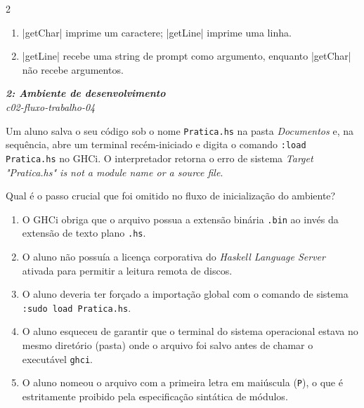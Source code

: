 \documentclass[a4paper,10pt,brazil]{article}
\begin{document}
\begin{multicols}{2}
\begin{enumerate}
  \item \haskellinline|getChar| imprime um caractere; \haskellinline|getLine| imprime uma linha.

  \item \haskellinline|getLine| recebe uma string de prompt como argumento, enquanto \haskellinline|getChar| não recebe argumentos.


\end{enumerate}

\begin{flushright}
  \footnotesize
  \textit{\textbf{2: Ambiente de desenvolvimento}}\\
  \textit{c02-fluxo-trabalho-04}\\

\end{flushright}
Um aluno salva o seu código sob o nome \texttt{Pratica.hs} na pasta \emph{Documentos} e, na sequência, abre um terminal recém-iniciado e digita o comando \texttt{:load Pratica.hs} no GHCi. O interpretador retorna o erro de sistema \emph{Target "Pratica.hs" is not a module name or a source file}. 

Qual é o passo crucial que foi omitido no fluxo de inicialização do ambiente?

\begin{enumerate}
  \item O GHCi obriga que o arquivo possua a extensão binária \texttt{.bin} ao invés da extensão de texto plano \texttt{.hs}.

  \item O aluno não possuía a licença corporativa do \emph{Haskell Language Server} ativada para permitir a leitura remota de discos.

  \item O aluno deveria ter forçado a importação global com o comando de sistema \texttt{:sudo load Pratica.hs}.

  \item O aluno esqueceu de garantir que o terminal do sistema operacional estava no mesmo diretório (pasta) onde o arquivo foi salvo antes de chamar o executável \texttt{ghci}.

  \item O aluno nomeou o arquivo com a primeira letra em maiúscula (\texttt{P}), o que é estritamente proibido pela especificação sintática de módulos.


\end{enumerate}


\end{multicols}
\end{document}
